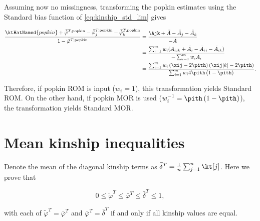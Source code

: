 \documentclass[11pt]{article}
\begin{document}
\begin{linenumbers}
\begin{appendices}
  Assuming now no missingness, transforming the popkin estimates using the Standard bias function of \cref{eq:kinship_std_lim} gives
  \begin{linenomath*}
  \begin{align*}
    \frac{
    \ktHatNamed{popkin}
    + \bar{ \hat{ \varphi } }^{T,\text{popkin}}
    - \bar{ \hat{ \varphi } }_j^{T,\text{popkin}}
    - \bar{ \hat{ \varphi } }_k^{T,\text{popkin}}
    }{
    1 - \bar{ \hat{ \varphi } }^{T,\text{popkin}}
    }
    &=
      \frac{
      \Ajk
      + \bar{A}
      - \bar{A}_j
      - \bar{A}_k
      }{
      - \bar{A}
      }
    \\
    &=
      \frac{
      \sum_{i=1}^m w_i ( A_{ijk} + \bar{A}_i - \bar{A}_{ij} - \bar{A}_{ik} )
      }{
      - \sum_{i=1}^m w_i \bar{A}_i
      }
    \\
    &=
      \frac{
      \sum_{i=1}^m w_i \left( \xij - 2 \pith \right) \left( \xij[k] - 2 \pith \right)
      }{
      \sum_{i=1}^m w_i 4 \pith \left( 1 - \pith \right)
      }
      .
  \end{align*}
  \end{linenomath*}
  Therefore, if popkin ROM is input ($w_i=1$), this transformation yields Standard ROM.
  On the other hand, if popkin MOR is used ($w_i^{-1} = \pith \left( 1 - \pith \right)$), the transformation yields Standard MOR.
  
  \section{Mean kinship inequalities}

  \label{sec:mean_kinship_ineqs}

  Denote the mean of the diagonal kinship terms as $\bar{\delta}^T = \frac{1}{n} \sum_{j=1}^n \kt[j]$.
  Here we prove that
  \begin{linenomath*}
  $$
  0 \le \tilde{\varphi}^T \le \bar{\varphi}^T \le \bar{\delta}^T \le 1,
  $$
  \end{linenomath*}
  with each of $\tilde{\varphi}^T = \bar{\varphi}^T$ and $\bar{\varphi}^T = \bar{\delta}^T$ if and only if all kinship values are equal.


\end{appendices}
\end{linenumbers}
\end{document}
